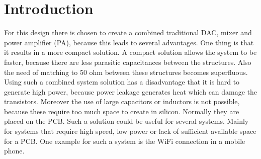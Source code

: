 \section{Introduction} \label{sec:introduction}
For this design there is chosen to create a combined traditional DAC, mixer and power amplifier (PA), because this leads to several advantages. One thing is that it results in a more compact solution. A compact solution allows the system to be faster, because there are less parasitic capacitances between the structures. Also the need of matching to 50 ohm between these structures becomes superfluous. Using such a combined system solution has a disadvantage that it is hard to generate high power, because power leakage generates heat which can damage the transistors. Moreover the use of large capacitors or inductors is not possible, because these require too much space to create in silicon. Normally they are placed on the PCB.
Such a solution could be useful for several systems. Mainly for systems that require high speed, low power or lack of sufficient available space for a PCB. One example for such a system is the WiFi connection in a mobile phone.

